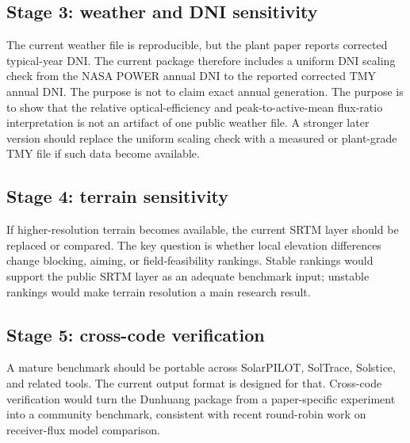 \documentclass[final,3p,times]{elsarticle}
\begin{document}
\subsection{Stage 3: weather and DNI sensitivity}
The current weather file is reproducible, but the plant paper reports corrected typical-year DNI. The current package therefore includes a uniform DNI scaling check from the NASA POWER annual DNI to the reported corrected TMY annual DNI. The purpose is not to claim exact annual generation. The purpose is to show that the relative optical-efficiency and peak-to-active-mean flux-ratio interpretation is not an artifact of one public weather file. A stronger later version should replace the uniform scaling check with a measured or plant-grade TMY file if such data become available.

\subsection{Stage 4: terrain sensitivity}
If higher-resolution terrain becomes available, the current SRTM layer should be replaced or compared. The key question is whether local elevation differences change blocking, aiming, or field-feasibility rankings. Stable rankings would support the public SRTM layer as an adequate benchmark input; unstable rankings would make terrain resolution a main research result.

\subsection{Stage 5: cross-code verification}
A mature benchmark should be portable across SolarPILOT, SolTrace, Solstice, and related tools. The current output format is designed for that. Cross-code verification would turn the Dunhuang package from a paper-specific experiment into a community benchmark, consistent with recent round-robin work on receiver-flux model comparison.
\end{document}
